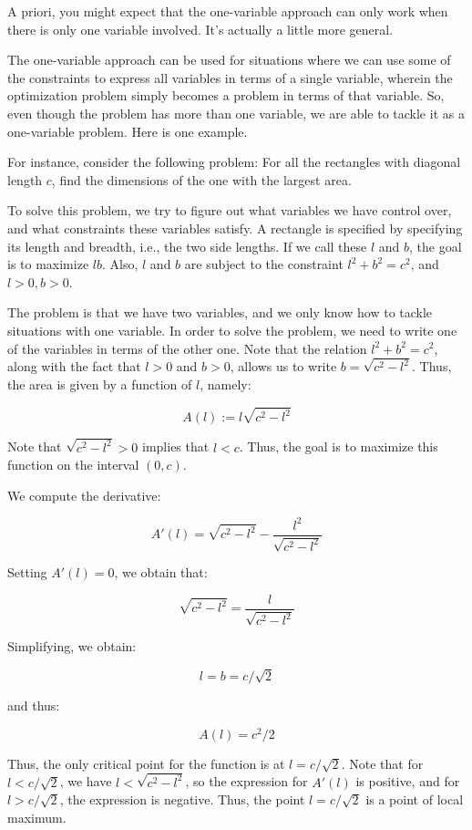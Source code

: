 \documentclass[10pt]{amsart}
\begin{document}
A priori, you might expect that the one-variable approach can only
work when there is only one variable involved. It's actually a little
more general.

The one-variable approach can be used for situations where we can use
some of the constraints to express all variables in terms of a single
variable, wherein the optimization problem simply becomes a problem in
terms of that variable. So, even though the problem has more than one
variable, we are able to tackle it as a one-variable problem. Here is
one example.

For instance, consider the following problem: For all the rectangles
with diagonal length $c$, find the dimensions of the one with the largest
area.

To solve this problem, we try to figure out what variables we have
control over, and what constraints these variables satisfy. A
rectangle is specified by specifying its length and breadth, i.e., the
two side lengths. If we call these $l$ and $b$, the goal is to
maximize $lb$. Also, $l$ and $b$ are subject to the constraint $l^2 +
b^2 = c^2$, and $l > 0, b > 0$.

The problem is that we have two variables, and we only know how to
tackle situations with one variable. In order to solve the problem, we
need to write one of the variables in terms of the other one. Note
that the relation $l^2 + b^2 = c^2$, along with the fact that $l > 0$
and $b > 0$, allows us to write $b = \sqrt{c^2 - l^2}$. Thus, the area
is given by a function of $l$, namely:

$$A(l) := l\sqrt{c^2 - l^2}$$

Note that $\sqrt{c^2 - l^2} > 0$ implies that $l < c$. Thus, the goal
is to maximize this function on the interval $(0,c)$.

We compute the derivative:

$$A'(l) = \sqrt{c^2 - l^2} - \frac{l^2}{\sqrt{c^2 - l^2}}$$

Setting $A'(l) = 0$, we obtain that:

$$\sqrt{c^2 - l^2} = \frac{l}{\sqrt{c^2 - l^2}}$$

Simplifying, we obtain:

$$l = b = c/\sqrt{2}$$

and thus:

$$A(l) = c^2/2$$

Thus, the only critical point for the function is at $l =
c/\sqrt{2}$. Note that for $l < c/\sqrt{2}$, we have $l < \sqrt{c^2 -
l^2}$, so the expression for $A'(l)$ is positive, and for $l >
c/\sqrt{2}$, the expression is negative. Thus, the point $l =
c/\sqrt{2}$ is a point of local maximum.
\end{document}
